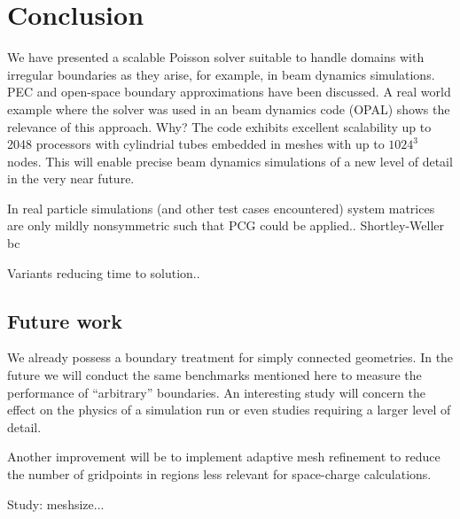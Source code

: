 \section{Conclusion}
\label{sec:concl}

We have presented a scalable Poisson solver suitable to handle domains
with irregular boundaries as they arise, for example, in beam dynamics
simulations.  PEC and open-space boundary approximations have been
discussed.  A real world example where the solver was used in an beam
dynamics code (OPAL) shows the relevance of this approach.
{\color{red}Why?}  The code exhibits excellent scalability up to 2048
processors with cylindrial tubes embedded in meshes with up to $1024^3$
nodes.  This will enable precise beam dynamics simulations of a new
level of detail in the very near future.

In real particle simulations (and other test cases encountered) system
matrices are only mildly nonsymmetric such that PCG could be applied..
{\color{red}Shortley-Weller bc}

Variants reducing time to solution..

\subsection{Future work}

We already possess a boundary treatment for simply connected geometries.
In the future we will conduct the same benchmarks mentioned here to
measure the performance of ``arbitrary'' boundaries.  An interesting
study will concern the effect on the physics of a simulation run or even
studies requiring a larger level of detail.

Another improvement will be to implement adaptive mesh refinement to
reduce the number of gridpoints in regions less relevant for
space-charge calculations.

Study: meshsize...

